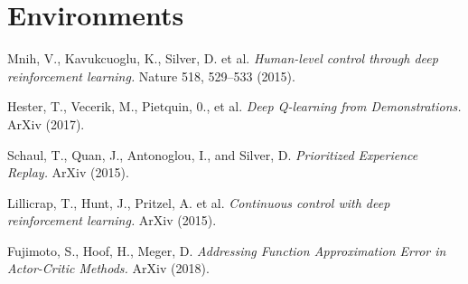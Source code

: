 \documentclass[12pt,a4paper]{article}
\begin{document}
\section{Environments}


\begin{thebibliography}{99}


Mnih, V., Kavukcuoglu, K., Silver, D. et al. 
  {\em Human-level control through deep reinforcement learning.} 
   Nature 518, 529–533 (2015).

Hester, T., Vecerik, M., Pietquin, 0., et al. 
  {\em Deep Q-learning from Demonstrations.}
  ArXiv (2017).

Schaul, T., Quan, J., Antonoglou, I., and Silver, D.
  {\em Prioritized Experience Replay.}
  ArXiv (2015).

Lillicrap, T., Hunt, J., Pritzel, A. et al.
  {\em Continuous control with deep reinforcement learning.}
  ArXiv (2015).

Fujimoto, S., Hoof, H., Meger, D.
  {\em Addressing Function Approximation Error in Actor-Critic Methods.}
  ArXiv (2018).

\end{thebibliography}


	
\end{document}
